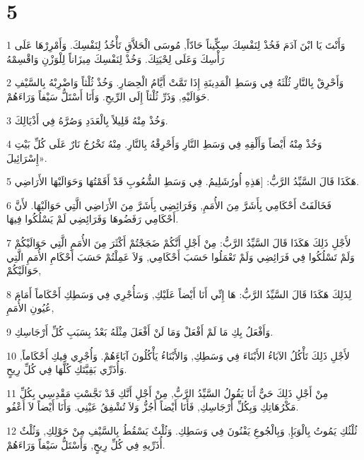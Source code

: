 \chapter{5}

\par 1 وَأَنْتَ يَا ابْنَ آدَمَ فَخُذْ لِنَفْسِكَ سِكِّيناً حَادّاً, مُوسَى الْحَلاَّقِ تَأْخُذُ لِنَفْسِكَ. وَأَمْرِرْهَا عَلَى رَأْسِكَ وَعَلَى لِحْيَتِكَ. وَخُذْ لِنَفْسِكَ مِيزَاناً لِلْوَزْنِ وَاقْسِمْهُ
\par 2 وَأَحْرِقْ بِالنَّارِ ثُلْثَهُ فِي وَسَطِ الْمَدِينَةِ إِذَا تَمَّتْ أَيَّامُ الْحِصَارِ. وَخُذْ ثُلْثاً وَاضْرِبْهُ بِالسَّيْفِ حَوَالَيْهِ, وَذَرِّ ثُلْثاً إِلَى الرِّيحِ. وَأَنَا أَسْتَلُّ سَيْفاً وَرَاءَهُمْ.
\par 3 وَخُذْ مِنْهُ قَلِيلاً بِالْعَدَدِ وَصُرَّهُ فِي أَذْيَالِكَ.
\par 4 وَخُذْ مِنْهُ أَيْضاً وَأَلْقِهِ فِي وَسَطِ النَّارِ وَأَحْرِقْهُ بِالنَّارِ. مِنْهُ تَخْرُجُ نَارٌ عَلَى كُلِّ بَيْتِ إِسْرَائِيلَ».
\par 5 هَكَذَا قَالَ السَّيِّدُ الرَّبُّ: [هَذِهِ أُورُشَلِيمُ. فِي وَسَطِ الشُّعُوبِ قَدْ أَقَمْتُهَا وَحَوَالَيْهَا الأَرَاضِي.
\par 6 فَخَالَفَتْ أَحْكَامِي بِأَشَرَّ مِنَ الأُمَمِ, وَفَرَائِضِي بِأَشَرَّ مِنَ الأَرَاضِي الَّتِي حَوَالَيْهَا. لأَنَّ أَحْكَامِي رَفَضُوهَا وَفَرَائِضِي لَمْ يَسْلُكُوا فِيهَا.
\par 7 لأَجْلِ ذَلِكَ هَكَذَا قَالَ السَّيِّدُ الرَّبُّ: مِنْ أَجْلِ أَنَّكُمْ ضَجَجْتُمْ أَكْثَرَ مِنَ الأُمَمِ الَّتِي حَوَالَيْكُمْ وَلَمْ تَسْلُكُوا فِي فَرَائِضِي وَلَمْ تَعْمَلُوا حَسَبَ أَحْكَامِي, وَلاَ عَمِلْتُمْ حَسَبَ أَحْكَامِ الأُمَمِ الَّتِي حَوَالَيْكُمْ,
\par 8 لِذَلِكَ هَكَذَا قَالَ السَّيِّدُ الرَّبُّ: هَا إِنِّي أَنَا أَيْضاً عَلَيْكِ, وَسَأُجْرِي فِي وَسَطِكِ أَحْكَاماً أَمَامَ عُيُونِ الأُمَمِ,
\par 9 وَأَفْعَلُ بِكِ مَا لَمْ أَفْعَلْ وَمَا لَنْ أَفْعَلَ مِثْلَهُ بَعْدُ بِسَبَبِ كُلِّ أَرْجَاسِكِ.
\par 10 لأَجْلِ ذَلِكَ تَأْكُلُ الآبَاءُ الأَبْنَاءَ فِي وَسَطِكِ, وَالأَبْنَاءُ يَأْكُلُونَ آبَاءَهُمْ. وَأُجْرِي فِيكِ أَحْكَاماً, وَأُذَرِّي بَقِيَّتَكِ كُلَّهَا فِي كُلِّ رِيحٍ.
\par 11 مِنْ أَجْلِ ذَلِكَ حَيٌّ أَنَا يَقُولُ السَّيِّدُ الرَّبُّ, مِنْ أَجْلِ أَنَّكِ قَدْ نَجَّسْتِ مَقْدِسِي بِكُلِّ مَكْرُهَاتِكِ وَبِكُلِّ أَرْجَاسِكِ, فَأَنَا أَيْضاً أَجُزُّ وَلاَ تُشْفِقُ عَيْنِي. وَأَنَا أَيْضاً لاَ أَعْفُو.
\par 12 ثُلْثُكِ يَمُوتُ بِالْوَبَإِ, وَبِالْجُوعِ يَفْنُونَ فِي وَسَطِكِ. وَثُلْثٌ يَسْقُطُ بِالسَّيْفِ مِنْ حَوْلِكِ, وَثُلْثٌ أُذَرِّيهِ فِي كُلِّ رِيحٍ, وَأَسْتَلُّ سَيْفاً وَرَاءَهُمْ.
